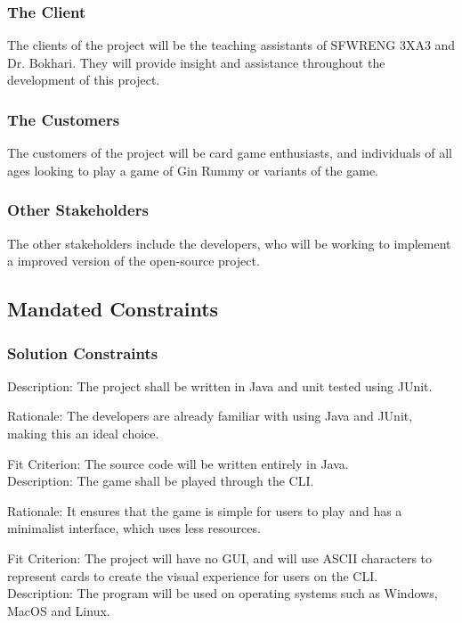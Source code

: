 \documentclass[12pt, titlepage]{article}
\begin{document}
\subsubsection{The Client}
The clients of the project will be the teaching assistants of SFWRENG 3XA3 and Dr. Bokhari. They will provide insight and assistance throughout the development of this project.

\subsubsection{The Customers}
The customers of the project will be card game enthusiasts, and individuals of all ages looking to play a game of Gin Rummy or variants of the game.

\subsubsection{Other Stakeholders}
The other stakeholders include the developers, who will be working to implement a improved version of the open-source project.
\subsection{Mandated Constraints}

\subsubsection{Solution Constraints}
\noindent Description: The project shall be written in Java and unit tested using JUnit.

\noindent Rationale: The developers are already familiar with using Java and JUnit, making this an ideal choice.

\noindent Fit Criterion: The source code will be written entirely in Java. \\

\noindent Description: The game shall be played through the CLI.

\noindent Rationale: It ensures that the game is simple for users to play and has a minimalist interface, which uses less resources.

\noindent Fit Criterion: The project will have no GUI, and will use ASCII characters to represent cards to create the visual experience for users on the CLI. \\

\noindent Description: The program will be used on operating systems such as Windows, MacOS and Linux.
\end{document}
